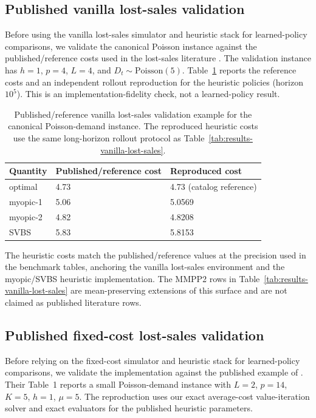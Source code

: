 \documentclass[11pt]{article}
\begin{document}
\subsection{Published vanilla lost-sales validation}

Before using the vanilla lost-sales simulator and heuristic stack for learned-policy comparisons, we
validate the canonical Poisson instance against the published/reference costs used in the lost-sales
literature \citep{Zipkin2008OldSystems,Xin2021CappedBaseStock}. The validation instance has
$h=1$, $p=4$, $L=4$, and $D_t\sim\mathrm{Poisson}(5)$. Table~\ref{tab:vanilla-lost-sales-validation} reports the reference
costs and an independent rollout reproduction for the heuristic policies (horizon $10^5$). This is
an implementation-fidelity check, not a learned-policy result.

\begin{table}[!htbp]
\centering
\caption{Published/reference vanilla lost-sales validation example for the canonical
Poisson-demand instance. The reproduced heuristic costs use the same long-horizon rollout protocol as
Table~\ref{tab:results-vanilla-lost-sales}.}
\label{tab:vanilla-lost-sales-validation}
\begin{tabular}{lll}
\toprule
Quantity & Published/reference cost & Reproduced cost \\
\midrule
optimal & 4.73 & 4.73 (catalog reference) \\
myopic-1 & 5.06 & 5.0569 \\
myopic-2 & 4.82 & 4.8208 \\
SVBS & 5.83 & 5.8153 \\
\bottomrule
\end{tabular}
\end{table}
\FloatBarrier

The heuristic costs match the published/reference values at the precision used in the benchmark
tables, anchoring the vanilla lost-sales environment and the myopic/SVBS heuristic implementation.
The MMPP2 rows in Table~\ref{tab:results-vanilla-lost-sales} are mean-preserving extensions of this
surface and are not claimed as published literature rows.

\subsection{Published fixed-cost lost-sales validation}

Before relying on the fixed-cost simulator and heuristic stack for learned-policy comparisons, we
validate the implementation against the published example of
\citet{Bijvank2015ParametricPolicies}. Their Table~1 reports a small Poisson-demand instance with
$L=2$, $p=14$, $K=5$, $h=1$, $\mu=5$. The
reproduction uses our exact average-cost value-iteration solver and exact evaluators for the published
heuristic parameters.
\end{document}

